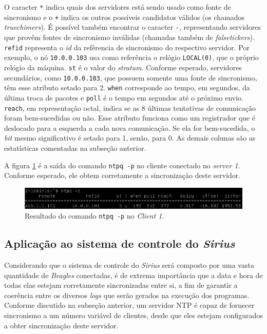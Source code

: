 \FloatBarrier

O caracter \texttt{*} indica quais dos servidores está sendo usado como fonte de
sincronismo e o \texttt{+} indica os outros possíveis candidatos válidos (os
chamados \textit {truechimers}). É possível também encontrar o caracter
\texttt{-}, representando servidores que provêm fontes de sincronismo inválidas
(chamadas também de \textit{falsetickers}). \texttt{refid} representa o
\textit{id} da refêrencia de sincronismo do respectivo servidor. Por exemplo, o
nó \texttt{10.0.0.103} usa como referência o relógio \texttt{LOCAL(0)}, que o
próprio relógio da máquina. \texttt{st} é o valor do \textit{stratum}. Conforme
esperado, servidores secundários, como \texttt{10.0.0.103}, que possuem somente
uma fonte de sincronismo, têm esse atributo setado para 2. \texttt{when}
corresponde ao tempo, em segundos, da última troca de pacotes e \texttt{poll} é
o tempo em segundos até o próximo envio. \texttt{reach}, em representação octal,
indica se as 8 últimas tentativas de comunicação foram bem-sucedidas ou não. 
Esse atributo funciona como um registrador que é deslocado para a esquerda a
cada nova comunicação. Se ela for bem-sucedida, o \textit {bit} mesmo
significativo é setado para 1, senão, para 0. As demais colunas são as
estatísticas comentadas na subseção anterior.

\vspace{12pt}

A figura \ref{fig:cl1} é a saída do comando \texttt{ntpq -p} no cliente
conectado no \textit{server 1}. Conforme esperado, ele obtem corretamente a
sincronização deste servidor.

\FloatBarrier

\begin{figure}[h]
    
    \centering
    \includegraphics[scale=0.7]{image/client1_screen}
    \caption {Resultado do comando \texttt{ntpq -p} no \textit{Client 1}.}
    \label{fig:cl1}  
\end{figure} 

\FloatBarrier
\subsection {Aplicação ao sistema de controle do \textit{Sirius}}

Considerando que o sistema de controle do \textit{Sirius} será composto por uma
vasta quantidade de \textit{Beagles} conectadas, é de extrema importância que a
data e hora de todas elas estejam corretamente sincronizadas entre si, a fim de
garantir a coerência entre os diversos \textit{logs} que serão gerados na
execução dos programas. Conforme discutido na subseção anterior, um servidor NTP
é capaz de fornecer sincronismo a um número variável de clientes, desde que eles
estejam configurados a obter sincronização deste servidor.

